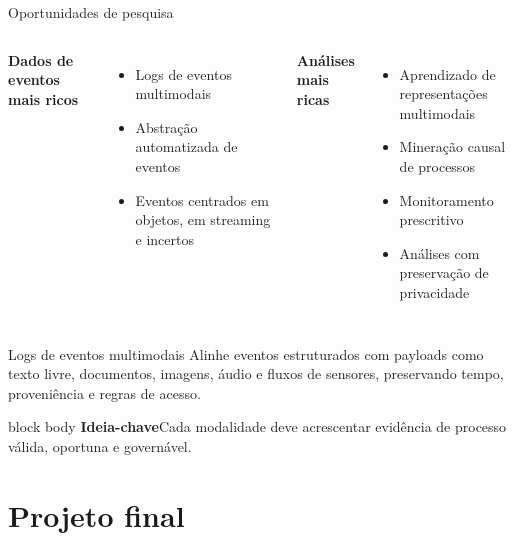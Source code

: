 \documentclass[aspectratio=169,11pt]{beamer}
\newcommand{\keyidea}[1]{%
  \begin{beamercolorbox}[rounded=true,sep=0.65em]{block body}
    \textbf{\color{Teal}Ideia-chave}\quad #1
  \end{beamercolorbox}
}
\begin{document}
\begin{frame}[shrink=8]{Oportunidades de pesquisa}
  \small
  \begin{columns}[T,onlytextwidth]
      \textbf{Dados de eventos mais ricos}
      \begin{itemize}
        \item Logs de eventos multimodais
        \item Abstração automatizada de eventos
        \item Eventos centrados em objetos, em streaming e incertos
      \end{itemize}
      \textbf{Análises mais ricas}
      \begin{itemize}
        \item Aprendizado de representações multimodais
        \item Mineração causal de processos
        \item Monitoramento prescritivo
        \item Análises com preservação de privacidade
      \end{itemize}
  \end{columns}
  \vspace{0.15cm}
  \begin{block}{Logs de eventos multimodais}
    Alinhe eventos estruturados com payloads como texto livre, documentos, imagens, áudio e fluxos de sensores, preservando tempo, proveniência e regras de acesso.
  \end{block}
  \vspace{0.05cm}
  \keyidea{Cada modalidade deve acrescentar evidência de processo válida, oportuna e governável.}
\end{frame}

\section{Projeto final}
\end{document}
